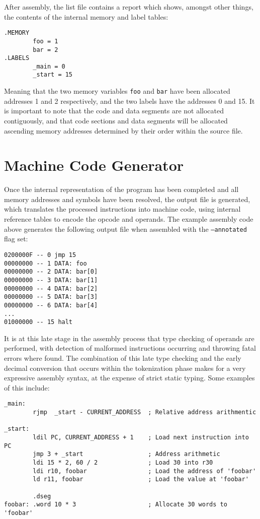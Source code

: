 \documentclass[12pt,twoside]{report}
\begin{document}
After assembly, the list file contains a report which shows, amongst
other things, the contents of the internal memory and label tables:

\begin{verbatim}
.MEMORY
        foo = 1
        bar = 2
.LABELS
        _main = 0
        _start = 15
\end{verbatim}

Meaning that the two memory variables \texttt{foo} and \texttt{bar}
have been allocated addresses 1 and 2 respectively, and the two labels
have the addresses 0 and 15. It is important to note that the code and
data segments are not allocated contiguously, and that code sections
and data segments will be allocated ascending memory addresses
determined by their order within the source file.

\section{Machine Code Generator}

Once the internal representation of the program has been completed and
all memory addresses and symbols have been resolved, the output file
is generated, which translates the processed instructions into machine
code, using internal reference tables to encode the opcode and
operands. The example assembly code above generates the following
output file when assembled with the \texttt{--annotated} flag set:

\begin{verbatim}
0200000F -- 0 jmp 15
00000000 -- 1 DATA: foo
00000000 -- 2 DATA: bar[0]
00000000 -- 3 DATA: bar[1]
00000000 -- 4 DATA: bar[2]
00000000 -- 5 DATA: bar[3]
00000000 -- 6 DATA: bar[4]
...
01000000 -- 15 halt
\end{verbatim}

It is at this late stage in the assembly process that type checking of
operands are performed, with detection of malformed instructions
occurring and throwing fatal errors where found. The combination of
this late type checking and the early decimal conversion that occurs
within the tokenization phase makes for a very expressive assembly
syntax, at the expense of strict static typing. Some examples of this
include:

\begin{verbatim}
_main:
        rjmp  _start - CURRENT_ADDRESS  ; Relative address arithmentic

_start:
        ldil PC, CURRENT_ADDRESS + 1    ; Load next instruction into PC
        jmp 3 + _start                  ; Address arithmetic
        ldi 15 * 2, 60 / 2              ; Load 30 into r30
        ldi r10, foobar                 ; Load the address of 'foobar'
        ld r11, foobar                  ; Load the value at 'foobar'

        .dseg
foobar: .word 10 * 3                    ; Allocate 30 words to 'foobar'
\end{verbatim}
\end{document}
